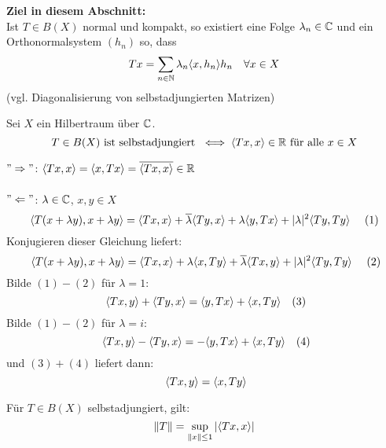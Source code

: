 \textbf{Ziel in diesem Abschnitt:} \\
	Ist $T \in B(X)$ normal und kompakt, so existiert eine Folge $\lambda_{n} \in \mathbb{C}$ und ein Orthonormalsystem $(h_{n})$ so, dass
	\[ T x = \sum_{n \in \mathbb{N}} \lambda_{n} \langle x , h_{n} \rangle h_{n} \quad \forall x \in X \]	
	(vgl. Diagonalisierung von selbstadjungierten Matrizen)



\begin{satz}
	Sei $X$ ein Hilbertraum über $\mathbb{C}$. \\
		\[ T \in B(X) \text{ ist selbstadjungiert } \iff \langle T x , x \rangle \in \mathbb{R} \text{ für alle } x \in X \]
\end{satz}

\begin{beweis}
	$" \Rightarrow "$: $\langle T x , x \rangle = \langle x , T x \rangle = \overline{\langle T x , x \rangle} \in \mathbb{R}$ \\ \\
	$" \Leftarrow "$: $\lambda \in \mathbb{C}$, $x, y \in X$ \\
	\[ \< T ( x + \lambda y ) , x + \lambda y \> =  \< T x , x \> + \overline{\lambda} \< T y , x \> + \lambda \< y, T x \> + | \lambda |^{2} \< T y , T y \> \quad (1) \label{eq:19.7.5-1} \]
	Konjugieren dieser Gleichung liefert:
	\[ \< T ( x + \lambda y ) , x + \lambda y \> =  \< T x , x \> + \lambda \< x , T y \> + \overline{\lambda} \< T x , y \> + | \lambda |^{2} \< T y , T y \> \quad (2) \label{eq:19.7.5-2} \]
	Bilde $\hyperref[eq:19.7.5-1]{(1)} - \hyperref[eq:19.7.5-2]{(2)}$ für $\lambda = 1$:
	\[  \< T x , y \> + \< T y , x \> = \< y , T x \> + \< x , T y \> \quad (3) \label{eq:19.7.5-3} \]
	Bilde $\hyperref[eq:19.7.5-1]{(1)} - \hyperref[eq:19.7.5-2]{(2)}$ für $\lambda = i$:
	\[ \< T x , y \> - \< T y , x \> = - \< y , T x \> + \< x , T y \> \quad (4) \label{eq:19.7.5-4} \]
	und $\hyperref[eq:19.7.5-3]{(3)} + \hyperref[eq:19.7.5-4]{(4)}$ liefert dann:
	\[ \< T x , y \> = \< x , T y \> \]
\end{beweis}


\begin{prop} \label{prop:19.8}
	Für $T \in B(X)$ selbstadjungiert, gilt:
	\[ \| T \| = \sup_{\| x \| \leq 1} |\langle T x , x \rangle| \]	
\end{prop}

